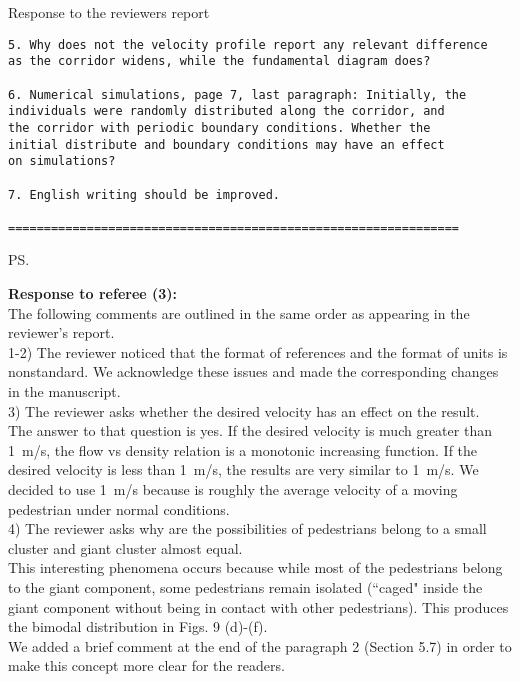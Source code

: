 \documentclass[a4paper,12pt]{letter}
\begin{document}
\begin{letter}{Response to the reviewers report}
\begin{verbatim}
5. Why does not the velocity profile report any relevant difference 
as the corridor widens, while the fundamental diagram does?

6. Numerical simulations, page 7, last paragraph: Initially, the 
individuals were randomly distributed along the corridor, and 
the corridor with periodic boundary conditions. Whether the 
initial distribute and boundary conditions may have an effect 
on simulations?

7. English writing should be improved.

===============================================================

\end{verbatim}


\ps{\textbf{Response to referee (3):} \\

The following comments are outlined in the same order as appearing in the
reviewer’s report. \\

1-2) The reviewer noticed that the format of references and the format of units is nonstandard. We acknowledge these issues and made the corresponding changes in the manuscript.\\

3) The reviewer asks whether the desired velocity has an effect on the result.\\

The answer to that question is yes. If the desired velocity is much greater than 1~m/s, the flow vs density relation is a monotonic increasing function. If the desired velocity is less than 1~m/s, the results are very similar to 1~m/s. We decided to use 1~m/s because is roughly the average velocity of a moving pedestrian under normal conditions. \\

4) The reviewer asks why are the possibilities of pedestrians belong to a small cluster and giant cluster almost equal. \\

This interesting phenomena occurs because while most of the pedestrians belong to the giant component, some pedestrians remain isolated (``caged" inside the giant component without being in contact with other pedestrians). This produces the bimodal distribution in Figs. 9 (d)-(f).\\

We added a brief comment at the end of the paragraph 2 (Section 5.7) in order to make this concept more clear for the readers.   

}
\end{letter}
\end{document}
